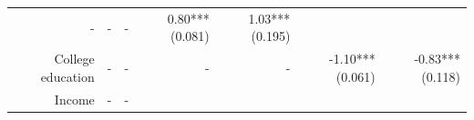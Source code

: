 \documentclass[]{article}
\begin{document}
\begin{longtable}[c]{@{}rrrrrrr@{}}
\begin{minipage}[t]{0.12\columnwidth}\raggedleft\strut
-
\strut\end{minipage} &
\begin{minipage}[t]{0.11\columnwidth}\raggedleft\strut
-
\strut\end{minipage} &
\begin{minipage}[t]{0.12\columnwidth}\raggedleft\strut
-
\strut\end{minipage} &
\begin{minipage}[t]{0.11\columnwidth}\raggedleft\strut
0.80*** (0.081)
\strut\end{minipage} &
\begin{minipage}[t]{0.11\columnwidth}\raggedleft\strut
1.03*** (0.195)
\strut\end{minipage}\tabularnewline
\begin{minipage}[t]{0.12\columnwidth}\raggedleft\strut
College education
\strut\end{minipage} &
\begin{minipage}[t]{0.11\columnwidth}\raggedleft\strut
-
\strut\end{minipage} &
\begin{minipage}[t]{0.12\columnwidth}\raggedleft\strut
-
\strut\end{minipage} &
\begin{minipage}[t]{0.11\columnwidth}\raggedleft\strut
-
\strut\end{minipage} &
\begin{minipage}[t]{0.12\columnwidth}\raggedleft\strut
-
\strut\end{minipage} &
\begin{minipage}[t]{0.11\columnwidth}\raggedleft\strut
-1.10*** (0.061)
\strut\end{minipage} &
\begin{minipage}[t]{0.11\columnwidth}\raggedleft\strut
-0.83*** (0.118)
\strut\end{minipage}\tabularnewline
\begin{minipage}[t]{0.12\columnwidth}\raggedleft\strut
Income
\strut\end{minipage} &
\begin{minipage}[t]{0.11\columnwidth}\raggedleft\strut
-
\strut\end{minipage} &
\begin{minipage}[t]{0.12\columnwidth}\raggedleft\strut
-
\strut\end{minipage} &
\begin{minipage}[t]{0.11\columnwidth}\raggedleft\strut

\end{minipage}
\end{longtable}
\end{document}
